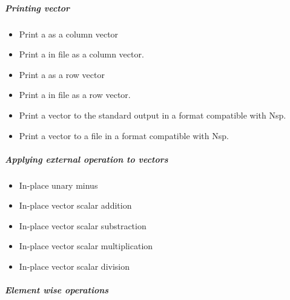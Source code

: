 \subparagraph{Printing vector}
\begin{itemize}
\item {}
  \sshortdescribe Print a \PnlVect as a column vector
\item {}
  \sshortdescribe Print a \PnlVect in file  as a column
  vector.
\item {}
  \sshortdescribe Print a \PnlVect as a row vector
\item {}
  \sshortdescribe Print a \PnlVect in file  as a row
  vector.
\item {}
  \sshortdescribe Print a vector to the standard output in a format
  compatible with Nsp.  
\item {}
  \sshortdescribe Print a vector to a file in a format compatible with Nsp. 
\end{itemize}

\subparagraph{Applying external operation to vectors}

\begin{itemize}
\item {}
  \sshortdescribe In-place unary minus
\item {}
  \sshortdescribe In-place vector scalar addition  
\item {}
  \sshortdescribe In-place vector scalar substraction  
\item {}
  \sshortdescribe In-place vector scalar multiplication  
\item {}
  \sshortdescribe In-place vector scalar division  
\end{itemize}

\subparagraph{Element wise operations}

